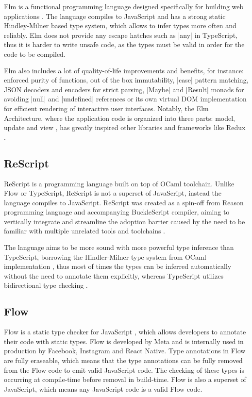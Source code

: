 Elm is a functional programming language designed specifically for building web applications \cite{ElmDelightfulLanguage}. The language compiles to JavaScript and has a strong static Hindley-Milner based type system, which allows to infer types more often and reliably. Elm does not provide any escape hatches such as \code|any| in TypeScript, thus it is harder to write unsafe code, as the types must be valid in order for the code to be compiled.

Elm also includes a lot of quality-of-life improvements and benefits, for instance: enforced purity of functions, out of the box immutability, \code|case| pattern matching, JSON decoders and encoders for strict parsing, \code|Maybe| and \code|Result| monads for avoiding \code|null| and \code|undefined| references or its own virtual DOM implementation for efficient rendering of interactive user interfaces. Notably, the Elm Architecture, where the application code is organized into three parts: model, update and view \cite{ElmArchitectureIntroduction}, has greatly inspired other libraries and frameworks like Redux \cite{PriorArtRedux2022}.

\subsection{ReScript}

ReScript is a programming language built on top of OCaml toolchain. Unlike Flow or TypeScript, ReScript is not a superset of JavaScript, instead the language compiles to JavaScript. ReScript was created as a spin-off from Reason programming language and accompanying BuckleScript compiler, aiming to vertically integrate and streamline the adoption barrier caused by the need to be familiar with multiple unrelated tools and toolchains \cite{BuckleScriptReasonRebranding}.

The language aims to be more sound with more powerful type inference than TypeScript, borrowing the Hindler-Milner type system from OCaml implementation \cite{EfficientInsightfulGeneralization,HistoryReScript2022}, thus most of times the types can be inferred automatically without the need to annotate them explicitly, whereas TypeScript utilizes bidirectional type checking \cite{ReconstructingTypeScriptPart}.

\subsection{Flow}

Flow is a static type checker for JavaScript \cite{chaudhuriFastPreciseType2017,Flow2023}, which allows developers to annotate their code with static types. Flow is developed by Meta and is internally used in production by Facebook, Instagram and React Native. Type annotations in Flow are fully eraseable, which means that the type annotations can be fully removed from the Flow code to emit valid JavaScript code. The checking of these types is occurring at compile-time before removal in build-time. Flow is also a superset of JavaScript, which means any JavaScript code is a valid Flow code.

